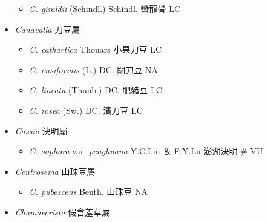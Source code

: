 \begin{itemize}
  \begin{itemize}
        \item[] \textit{C. giraldii} (Schindl.) Schindl.  彎龍骨   LC
  \end{itemize}
 \item[] \textit{Canavalia} 刀豆屬
                                
  \begin{itemize}
        \item[] \textit{C. cathartica} Thouars  小果刀豆   LC
        \item[] \textit{C. ensiformis} (L.) DC.  關刀豆   NA
        \item[] \textit{C. lineata} (Thunb.) DC.  肥豬豆   LC
        \item[] \textit{C. rosea} (Sw.) DC.  濱刀豆   LC
  \end{itemize}
 \item[] \textit{Cassia} 決明屬
                                
  \begin{itemize}
        \item[] \textit{C. sophora} var. \textit{penghuana} Y.C.Liu ＆ F.Y.Lu  澎湖決明  \# VU
  \end{itemize}
 \item[] \textit{Centrosema} 山珠豆屬
                                
  \begin{itemize}
        \item[] \textit{C. pubescens} Benth.  山珠豆   NA
  \end{itemize}
 \item[] \textit{Chamaecrista} 假含羞草屬
                                

\end{itemize}
